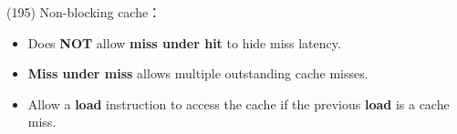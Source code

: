 \item \begin{theorem}{(195)} Non-blocking cache： \begin{itemize}
        \item Does \textbf{NOT} allow \textbf{miss under hit} to hide miss latency. 
        \item \textbf{Miss under miss} allows multiple outstanding cache misses.
        \item Allow a \textbf{load} instruction to access the cache if the previous \textbf{load} is a cache miss.
    \end{itemize}
\end{theorem}
